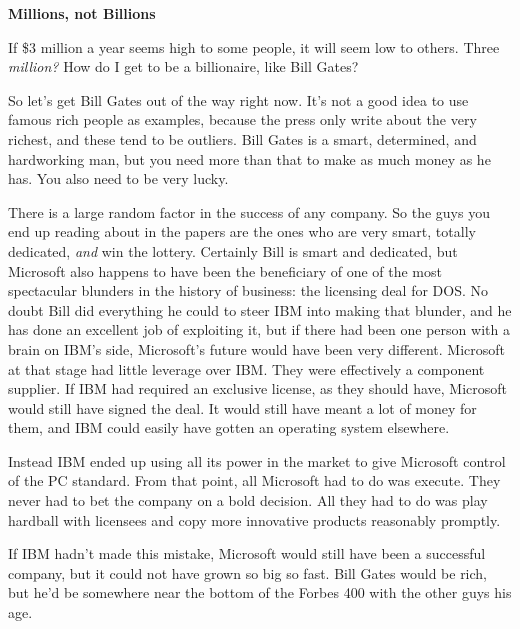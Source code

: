 \textbf{Millions, not Billions}

If \$3 million a year seems high to some people,
                    it will seem low to others. Three \emph{million?} How do I
                    get to be a billionaire, like Bill Gates?

So
                    let's get Bill Gates out of the way right now. It's not a
                    good idea to use famous rich people as examples, because the
                    press only write about the very richest, and these tend to
                    be outliers. Bill Gates is a smart, determined, and
                    hardworking man, but you need more than that to make as much
                    money as he has. You also need to be very lucky.

There
                    is a large random factor in the success of any company. So
                    the guys you end up reading about in the papers are the ones
                    who are very smart, totally dedicated, \emph{and} win the
                    lottery. Certainly Bill is smart and dedicated, but
                    Microsoft also happens to have been the beneficiary of one
                    of the most spectacular blunders in the history of business:
                    the licensing deal for DOS. No doubt Bill did everything he
                    could to steer IBM into making that blunder, and he has done
                    an excellent job of exploiting it, but if there had been one
                    person with a brain on IBM's side, Microsoft's future would
                    have been very different. Microsoft at that stage had little
                    leverage over IBM. They were effectively a component
                    supplier. If IBM had required an exclusive license, as they
                    should have, Microsoft would still have signed the deal. It
                    would still have meant a lot of money for them, and IBM
                    could easily have gotten an operating system elsewhere.

Instead
                    IBM ended up using all its power in the market to give
                    Microsoft control of the PC standard. From that point, all
                    Microsoft had to do was execute. They never had to bet the
                    company on a bold decision. All they had to do was play
                    hardball with licensees and copy more innovative products
                    reasonably promptly.

If IBM hadn't made this
                    mistake, Microsoft would still have been a successful
                    company, but it could not have grown so big so fast. Bill
                    Gates would be rich, but he'd be somewhere near the bottom
                    of the Forbes 400 with the other guys his age.

